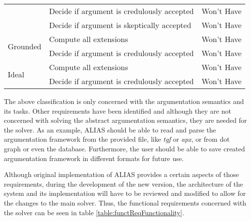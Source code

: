 \begin{longtable}{|l|l|l|}
	& Decide if argument is credulously accepted & Won't Have      \\ \cline{2-3} 
	& Decide if argument is skeptically accepted & Won't Have      \\ \hline
	\multirow{2}{*}{Grounded}    & Compute all extensions                           & Won't Have      \\ \cline{2-3} 
	& Decide if argument is credulously accepted & Won't Have      \\ \hline
	\multirow{2}{*}{Ideal}       & Compute all extensions                           & Won't Have      \\ \cline{2-3} 
	& Decide if argument is credulously accepted & Won't Have      \\ \hline
\end{longtable}

The above classification is only concerned with the argumentation semantics and its tasks. Other requirements have been identified and although they are not concerned with solving the abstract argumentation semantics, they are needed for the solver. As an example, ALIAS should be able to read and parse the argumentation framework from the provided file, like \textit{tgf} or \textit{apx}, or from dot graph or even the database. Furthermore, the user should be able to save created argumentation framework in different formats for future use. 

Although original implementation of ALIAS provides a certain aspects of those requirements, during the development of the new version, the architecture of the system and its implementation will have to be reviewed and modified to allow for the changes to the main solver. Thus, the functional requirements concerned with the solver can be seen in table \ref{table:functReqFunctionality}.


